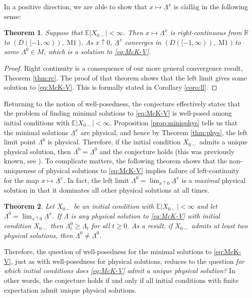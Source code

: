 \documentclass[12pt]{amsart}
\newcommand{\R}{\mathbb{R}}
\newcommand{\ubar}{\underline}
\newcommand{\E}{\mathbb{E}}
\theoremstyle{plain}
\newtheorem{thm}{Theorem}[section]
\theoremstyle{definition}
\begin{document}
In a positive direction, we are able to show that $x\mapsto \ubar{\Lambda}^x$ is c\`adl\`ag in the following sense:

\begin{thm}
Suppose that $\E|X_{0-}|<\infty$. Then $x\mapsto \ubar{\Lambda}^x$ is right-continuous from $\R$ to $(D([-1,\infty)),\operatorname{M1})$. As $x\uparrow 0$, $\ubar{\Lambda}^x$ converges in $(D([-1,\infty)),\operatorname{M1})$ to some $\Lambda^0\in M$, which is a solution to \eqref{eq:McK-V}.
\end{thm}
\begin{proof}
Right continuity is a consequence of our more general convergence result, Theorem \ref{thm:rc}. The proof of that theorem shows that the left limit gives some solution to \eqref{eq:McK-V}. This is formally stated in Corollary \ref{coro:ll}.
\end{proof}
Returning to the notion of well-posedness, the conjecture effectively states that the problem of finding minimal solutions to \eqref{eq:McK-V} is well-posed among initial conditions with $\E|X_{0-}|<\infty$. 
Proposition \ref{prop:minisphys} tells us that the minimal solutions $\ubar{\Lambda}^x$ are physical, and hence by Theorem \ref{thm:phys}, the left limit point $\Lambda^0$ is physical. Therefore, if the initial condition $X_{0-}$ admits a unique physical solution, then $\Lambda^0=\ubar{\Lambda}^0$ and the conjecture holds (this was previously known, see \cite[Theorem 6.6]{cuchiero_propagation_2020}). 
To complicate matters, the following theorem shows that the non-uniqueness of physical solutions to \eqref{eq:McK-V} implies failure of left-continuity for the map $x\mapsto\ubar{\Lambda}^x$. In fact, the left limit $\Lambda^0=\lim_{x\uparrow 0}\ubar{\Lambda}^x$ is a \emph{maximal} physical solution in that it dominates all other physical solutions at all times.

\begin{thm}
\label{thm:nonunique}
Let $X_{0-}$ be an initial condition with $\E|X_{0-}|<\infty$ and let $\Lambda^0=\lim_{x\uparrow 0}\ubar{\Lambda}^x$. If $\Lambda$ is any physical solution to \eqref{eq:McK-V} with initial condition $X_{0-}$ then $\Lambda^0_t\ge \Lambda_t$ for all $t\ge 0$. As a result, if $X_{0-}$ admits at least two physical solutions, then $\Lambda^0\neq\ubar{\Lambda}^0$.
\end{thm}

Therefore, the question of well-posedness for the minimal solutions to \eqref{eq:McK-V}, just as with well-posedness for physical solutions, reduces to the question \emph{for which initial conditions does \eqref{eq:McK-V} admit a unique physical solution?} In other words, the conjecture holds if and only if all initial conditions with finite expectation admit unique physical solutions.
\end{document}
